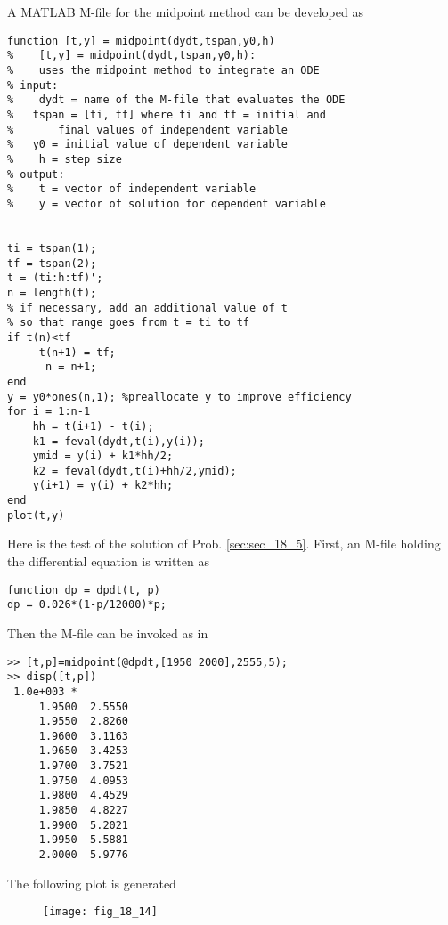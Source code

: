 \documentclass[../main.tex]{subfiles}
\begin{document}
\section{}
A MATLAB M-file for the midpoint method can be developed as 
	\bigbreak
\begin{lstlisting}[numbers=none]
function [t,y] = midpoint(dydt,tspan,y0,h)
%	 [t,y] = midpoint(dydt,tspan,y0,h):
%	 uses the midpoint method to integrate an ODE
% input:
%	 dydt = name of the M-file that evaluates the ODE
% 	tspan = [ti, tf] where ti and tf = initial and
% 		final values of independent variable
% 	y0 = initial value of dependent variable
%	 h = step size
% output:
%	 t = vector of independent variable
%	 y = vector of solution for dependent variable


ti = tspan(1);
tf = tspan(2);
t = (ti:h:tf)';
n = length(t);
% if necessary, add an additional value of t
% so that range goes from t = ti to tf
if t(n)<tf
	 t(n+1) = tf;
	  n = n+1;
end
y = y0*ones(n,1); %preallocate y to improve efficiency
for i = 1:n-1
 	hh = t(i+1) - t(i);
 	k1 = feval(dydt,t(i),y(i));
 	ymid = y(i) + k1*hh/2;
 	k2 = feval(dydt,t(i)+hh/2,ymid);
 	y(i+1) = y(i) + k2*hh;
end
plot(t,y)
\end{lstlisting}
	\bigbreak
Here is the test of the solution of Prob. \ref{sec:sec_18_5}. First, an M-file holding the differential
equation is written as
	\bigbreak
\begin{lstlisting}[numbers=none]
function dp = dpdt(t, p)
dp = 0.026*(1-p/12000)*p; 
\end{lstlisting}
	\bigbreak
Then the M-file can be invoked as in 
	\bigbreak
\begin{lstlisting}[numbers=none]
>> [t,p]=midpoint(@dpdt,[1950 2000],2555,5);
>> disp([t,p])
 1.0e+003 *
	 1.9500	 2.5550
	 1.9550	 2.8260
	 1.9600	 3.1163
	 1.9650	 3.4253
	 1.9700	 3.7521
	 1.9750	 4.0953
	 1.9800	 4.4529
	 1.9850	 4.8227
	 1.9900	 5.2021
	 1.9950	 5.5881
	 2.0000	 5.9776 
\end{lstlisting}
	\bigbreak
The following plot is generated
	\bigbreak
	\begin{figure}[H]
		\texttt{[image: fig\_18\_14]}
		\label{fig:fig_18_14}
	\end{figure}
	\bigbreak
\end{document}
